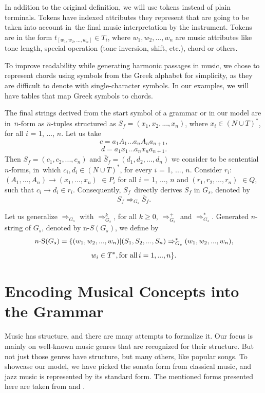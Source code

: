 In addition to the original definition, we will use tokens instead of plain terminals. Tokens have indexed attributes they represent that are going to be taken into account in~the final music interpretation by the instrument. Tokens are in the form $t_{[w_1, w_2, ..., w_n]} \in T_i$, where $w_1, w_2, ..., w_n$ are music attributes like tone length, special operation (tone inversion, shift, etc.), chord or others.

To improve readability while generating harmonic passages in music, we chose to represent chords using symbols from the Greek alphabet for simplicity, as they are difficult to denote with single-character symbols. In our examples, we will have tables that map Greek symbols to chords.

The final strings derived from the start symbol of a grammar or in our model are in~$n$-form as $n$-tuples structured as $S_f = (x_1, x_2, ..., x_n)$, where $x_i \in (N \cup T)^*$, for all $i$ = 1, ..., $n$. Let us take
$$c = a_1A_1...a_nA_na_{n+1},$$
$$d = a_1x_1...a_nx_na_{n+1}.$$ Then $S_f = (c_1, c_2, ..., c_n)$ and $\bar{S}_f = (d_1, d_2, ..., d_n)$ we consider to be sentential $n$-forms, in~which $c_i,d_i \in (N \cup T)^*$, for every $i$ = 1, ..., $n$. Consider $r_i$: $(A_1,...,A_n) \rightarrow (x_1,...,x_n)$ $\in P_i$ for all $i$ = 1, ..., $n$ and $(r_1, r_2, ..., r_n)$ $\in Q$, such that $c_i \rightarrow d_i \in r_i$. Consequently, $S_f$~directly derives $\bar{S}_f$ in $G_s$, denoted by $$S_f \Rightarrow_{G_s} \bar{S}_f.$$

Let us generalize $\Rightarrow_{G_s}$ with $\Rightarrow_{G_s}^k$, for all $k \geq 0$, $\Rightarrow_{G_s}^+$ and $\Rightarrow_{G_s}^*$. Generated $n$-string of $G_s$, denoted by \textnormal{n-}$S(G_s)$, we define by $$n\textnormal{-S}(G_s) = \{(w_1, w_2, ..., w_n) | (S_1, S_2, ..., S_n) \Rightarrow_{G_s}^* (w_1, w_2, ..., w_n),$$ $$w_i \in T^*, \textnormal{for all} \, i = 1, ..., n\}.$$
\section{Encoding Musical Concepts into the Grammar}
Music has structure, and there are many attempts to formalize it. Our focus is mainly on well-known music genres that are recognized for their structure. But not just those genres have structure, but many others, like popular songs. To showcase our model, we have picked the sonata form from classical music, and jazz music is represented by its standard form. The mentioned forms presented here are taken from \cite{ravelliJazzForm2025} and \cite{Kadlec2022}.

